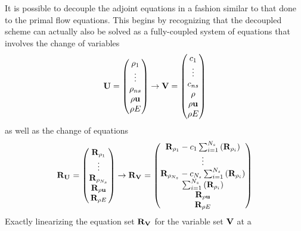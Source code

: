 It is possible to decouple the adjoint equations in a fashion similar to that
done to the primal flow equations.  This begins by recognizing that the
decoupled scheme can actually also be solved as a fully-coupled system of
equations that involves the change of variables
\begin{equation}
  \mathbf U = \begin{pmatrix}
    \rho_1 \\
    \vdots \\
    \rho_{ns} \\
    \rho \mathbf u \\
    \rho E
  \end{pmatrix}
  \rightarrow
  \mathbf V = \begin{pmatrix}
    c_1 \\
    \vdots \\
    c_{ns} \\
    \rho \\
    \rho \mathbf u \\
    \rho E
  \end{pmatrix}
  \label{u-v-vars}
\end{equation}
as well as the change of equations
\begin{equation}
  \mathbf R_{{\mathbf U}_{}} =
  \begin{pmatrix}
    \mathbf R_{\rho_1} \\
    \vdots \\
    \mathbf R_{\rho_{N_s}} \\
    \mathbf R_{\rho \mathbf u} \\
    \mathbf R_{\rho E}
  \end{pmatrix}
  \rightarrow
  \mathbf R_{{\mathbf V}_{}} =
  \begin{pmatrix}
    \mathbf R_{\rho_1} - c_1 \sum_{i=1}^{N_s}\left(\mathbf R_{\rho_i}\right) \\
    \vdots \\
    \mathbf R_{\rho_{N_s}} - c_{N_s} \sum_{i=1}^{N_s}\left(\mathbf R_{\rho_i}\right) \\
    \sum_{i=1}^{N_s}\left(\mathbf R_{\rho_i}\right) \\
    \mathbf R_{\rho \mathbf u} \\
    \mathbf R_{\rho E}
  \end{pmatrix}
  \label{fc-to-dc-res}
\end{equation}
Exactly linearizing the equation set $\mathbf R_{{\mathbf V}_{}}$ for the variable set $\mathbf V$ at a
